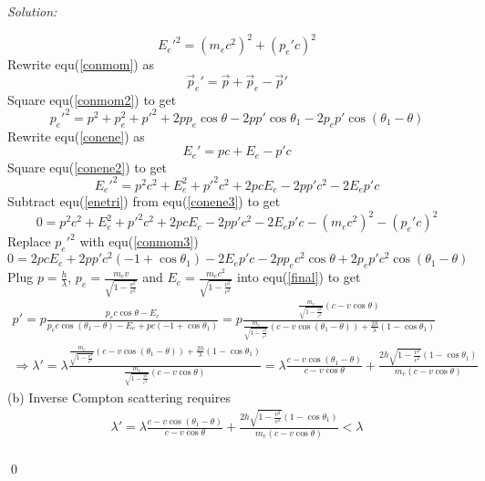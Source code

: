 \documentclass[12pt]{article}
\newenvironment{sol}
    {\emph{Solution:}
    }
    {
    \qed
    }
\begin{document}
\begin{sol}
\begin{equation}
\label{enetri}
E_e'^2=(m_ec^2)^2+(p_e'c)^2
\end{equation}
Rewrite equ(\ref{conmom}) as
\begin{equation}
\label{conmom2}
\vec{p}_e'=\vec{p}+\vec{p}_e-\vec{p}'
\end{equation}
Square equ(\ref{conmom2}) to get
\begin{equation}
\label{conmom3}
p_e'^2=p^2+p_e^2+p'^2+2pp_e\cos\theta-2pp'\cos\theta_1-2p_ep'\cos(\theta_1-\theta)
\end{equation}
Rewrite equ(\ref{conene}) as
\begin{equation}
\label{conene2}
E_e'=pc+E_e-p'c
\end{equation}
Square equ(\ref{conene2}) to get
\begin{equation}
\label{conene3}
E_e'^2=p^2c^2+E_e^2+p'^2c^2+2pcE_e-2pp'c^2-2E_ep'c
\end{equation}
Subtract equ(\ref{enetri}) from equ(\ref{conene3}) to get
\begin{equation}
0=p^2c^2+E_e^2+p'^2c^2+2pcE_e-2pp'c^2-2E_ep'c-(m_ec^2)^2-(p_e'c)^2
\end{equation}
Replace $p_e'^2$ with equ(\ref{conmom3})
\begin{equation}
\label{final}
0=2pcE_e+2pp'c^2(-1+\cos\theta_1)-2E_ep'c-2pp_ec^2\cos\theta+2p_ep'c^2\cos(\theta_1-\theta)
\end{equation}
Plug $p=\frac{h}{\lambda}$, $p_e=\frac{m_ev}{\sqrt{1-\frac{v^2}{c^2}}}$ and $E_e=\frac{m_ec^2}{\sqrt{1-\frac{v^2}{c^2}}}$ into equ(\ref{final}) to get
\footnotesize\begin{gather}
p'=p\frac{p_ec\cos\theta-E_e}{p_ec\cos(\theta_1-\theta)-E_e+pc(-1+\cos\theta_1)}=p\frac{\frac{m_e}{\sqrt{1-\frac{v^2}{c^2}}}(c-v\cos\theta)}{\frac{m_e}{\sqrt{1-\frac{v^2}{c^2}}}(c-v\cos(\theta_1-\theta))+\frac{2h}{\lambda}(1-\cos\theta_1)}\\
\Longrightarrow\lambda'=\lambda\frac{\frac{m_e}{\sqrt{1-\frac{v^2}{c^2}}}(c-v\cos(\theta_1-\theta))+\frac{2h}{\lambda}(1-\cos\theta_1)}{\frac{m_e}{\sqrt{1-\frac{v^2}{c^2}}}(c-v\cos\theta)}=\lambda\frac{c-v\cos(\theta_1-\theta)}{c-v\cos\theta}+\frac{2h\sqrt{1-\frac{v^2}{c^2}}(1-\cos\theta_1)}{m_e(c-v\cos\theta)}
\end{gather}\normalsize
(b) Inverse Compton scattering requires
\begin{gather}
\lambda'=\lambda\frac{c-v\cos(\theta_1-\theta)}{c-v\cos\theta}+\frac{2h\sqrt{1-\frac{v^2}{c^2}}(1-\cos\theta_1)}{m_e(c-v\cos\theta)}<\lambda\\

\end{gather}
\end{sol}
\end{document}
